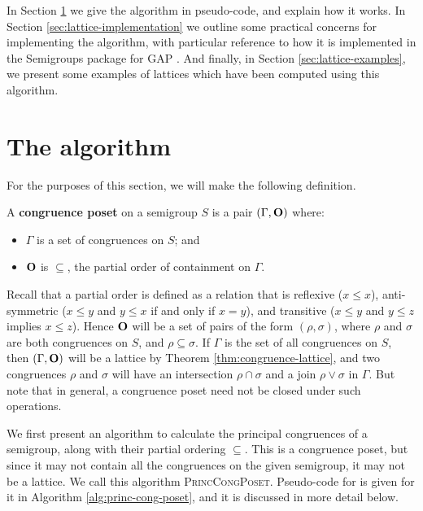 In Section \ref{sec:lattice-algorithm} we give the algorithm in pseudo-code, and
explain how it works.  In Section \ref{sec:lattice-implementation} we outline
some practical concerns for implementing the algorithm, with particular
reference to how it is implemented in the Semigroups package \cite{semigroups}
for GAP \cite{gap}.  And finally, in Section \ref{sec:lattice-examples}, we
present some examples of lattices which have been computed using this algorithm.

\section{The algorithm}
\label{sec:lattice-algorithm}

For the purposes of this section, we will make the following definition.

\begin{definition}
  \label{def:congruence-poset}
  A \textbf{congruence poset} on a semigroup $S$ is a pair $(\Gamma, \mathbf{O})$
  where:
  \begin{itemize}
  \item $\Gamma$ is a set of congruences on $S$; and
  \item $\mathbf{O}$ is $\subseteq$, the partial order of containment on $\Gamma$.
  \end{itemize}
\end{definition}

Recall that a partial order is defined as a relation that is reflexive
($x \leq x$), anti-symmetric ($x \leq y$ and $y \leq x$ if and only if $x = y$),
and transitive ($x \leq y$ and $y \leq z$ implies $x \leq z$).
Hence $\mathbf{O}$ will be a set of pairs of the form $(\rho, \sigma)$, where $\rho$
and $\sigma$ are both congruences on $S$, and $\rho \subseteq \sigma$.  If
$\Gamma$ is the set of all congruences on $S$, then $(\Gamma, \mathbf{O})$ will be a
lattice by Theorem \ref{thm:congruence-lattice}, and two congruences $\rho$ and
$\sigma$ will have an intersection $\rho \cap \sigma$ and a join
$\rho \vee \sigma$ in $\Gamma$.  But note that in general, a congruence poset
need not be closed under such operations.

We first present an algorithm to calculate the principal congruences of a
semigroup, along with their partial ordering $\subseteq$.  This is a congruence
poset, but since it may not contain all the congruences on the given semigroup,
it may not be a lattice.  We call this algorithm \textsc{PrincCongPoset}.
Pseudo-code for is given for it in Algorithm \ref{alg:princ-cong-poset}, and it
is discussed in more detail below.

